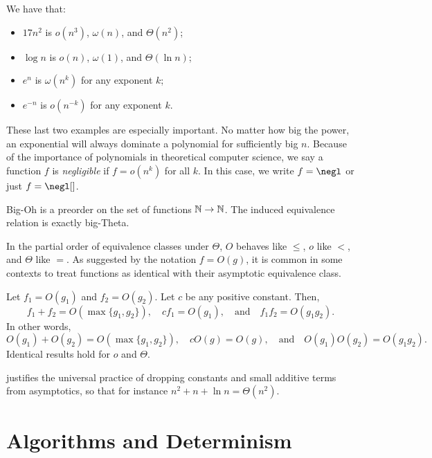 \begin{ex}We have that:
  \begin{itemize}
    \item $17n^2$ is $o(n^3)$, $\omega(n)$, and $\Theta(n^2)$;
    \item $\log n$ is $o(n)$, $\omega(1)$, and $\Theta(\ln n)$;
    \item $e^n$ is $\omega(n^k)$ for any exponent $k$;
    \item $e^{-n}$ is $o(n^{-k})$ for any exponent $k$.
  \end{itemize}

  These last two examples are especially important. No matter how big the power,
  an exponential will always dominate a polynomial for sufficiently big $n$.
  Because of the importance of polynomials in theoretical computer science, we
  say a function $f$ is \emph{negligible} if $f = o(n^k)$ for all $k$. In this
  case, we write $f = \negl$ or just $f = \negl[]$.
\end{ex}

\begin{prop}
  Big-Oh is a preorder on the set of functions $\mathbb{N}\to\mathbb{N}$. The induced
  equivalence relation is exactly big-Theta.
\end{prop}

In the partial order of equivalence classes under $\Theta$, $O$ behaves like
$\leq$, $o$ like $<$, and $\Theta$ like $=$. As suggested by the notation $f =
O(g)$, it is common in some contexts to treat functions as identical with their
asymptotic equivalence class.

\begin{prop}\label{thm:asymptotic closure}
  Let $f_1 = O(g_1)$ and $f_2 = O(g_2)$. Let $c$ be any positive constant. Then,
  \[
    f_1 + f_2 = O(\max\{g_1,g_2\}),\quad
    cf_1 = O(g_1),\quad\text{and}\quad
    f_1f_2 = O(g_1g_2).
  \]
  In other words, \[
    O(g_1) + O(g_2) = O(\max\{g_1,g_2\}),\quad cO(g) = O(g),\quad\text{and}\quad O(g_1)O(g_2) = O(g_1g_2).
  \]
  Identical results hold for $o$ and $\Theta$.
\end{prop}

 justifies the universal practice
of dropping constants and small additive terms from asymptotics, so that for
instance $n^2 + n + \ln n = \Theta(n^2)$.

\section{Algorithms and Determinism}

